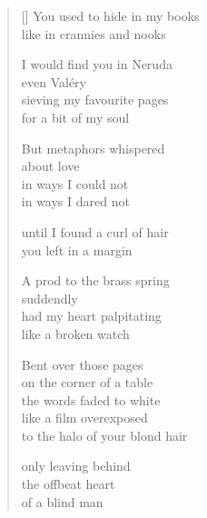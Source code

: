 \documentclass[12pt,a4paper]{article}
\begin{document}

\newpage

\poemtitle{}

\settowidth{\versewidth}{to the halo of your blond hair}

\bigskip

\begin{verse}[\versewidth]
  You used to hide in my books \\
  like in crannies and nooks

  I would find you in Neruda \\
  even Valéry \\
  sieving my favourite pages \\
  for a bit of my soul

  But metaphors whispered \\
  about love \\
  in ways I could not \\
  in ways I dared not

  until I found a curl of hair \\
  you left in a margin

  A prod to the brass spring \\
  suddendly \\
  had my heart palpitating \\
  like a broken watch

  Bent over those pages \\
  on the corner of a table \\
  the words faded to white \\
  like a film overexposed \\
  to the halo of your blond hair

  only leaving behind \\
  the offbeat heart \\
  of a blind man
\end{verse}


\newpage

\poemtitle{}

\settowidth{\versewidth}{on your body of soft amber}

\bigskip
\end{document}
